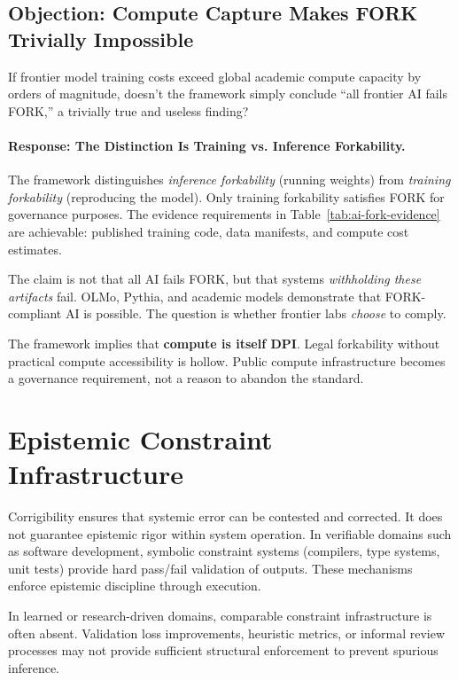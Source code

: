 \documentclass{article}
\theoremstyle{definition}
\begin{document}
\subsection{Objection: Compute Capture Makes FORK Trivially Impossible}

If frontier model training costs exceed global academic compute capacity by orders of magnitude, doesn't the framework simply conclude ``all frontier AI fails FORK,'' a trivially true and useless finding?

\paragraph{Response: The Distinction Is Training vs. Inference Forkability.} The framework distinguishes \textit{inference forkability} (running weights) from \textit{training forkability} (reproducing the model). Only training forkability satisfies FORK for governance purposes. The evidence requirements in Table~\ref{tab:ai-fork-evidence} are achievable: published training code, data manifests, and compute cost estimates.

The claim is not that all AI fails FORK, but that systems \textit{withholding these artifacts} fail. OLMo, Pythia, and academic models demonstrate that FORK-compliant AI is possible. The question is whether frontier labs \textit{choose} to comply.

The framework implies that \textbf{compute is itself DPI}. Legal forkability without practical compute accessibility is hollow. Public compute infrastructure becomes a governance requirement, not a reason to abandon the standard.


\section{Epistemic Constraint Infrastructure}
\label{sec:epistemic-constraint}

Corrigibility ensures that systemic error can be contested and corrected. It does not guarantee epistemic rigor within system operation. In verifiable domains such as software development, symbolic constraint systems (compilers, type systems, unit tests) provide hard pass/fail validation of outputs. These mechanisms enforce epistemic discipline through execution.

In learned or research-driven domains, comparable constraint infrastructure is often absent. Validation loss improvements, heuristic metrics, or informal review processes may not provide sufficient structural enforcement to prevent spurious inference.
\end{document}
